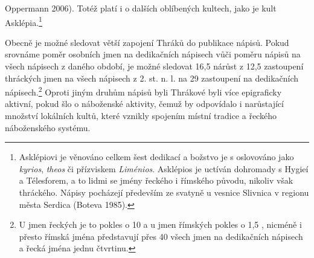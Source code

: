 Oppermann 2006). Totéž platí i o dalších oblíbených kultech, jako je kult Asklépia.\footnote{Asklépiovi je věnováno celkem šest dedikací a božstvo je s oslovováno jako {\em kyrios}, {\em theos} či přízviskem {\em Liménios}. Asklépios je uctíván dohromady s Hygieí a Télesforem, a to lidmi se jmény řeckého i římského původu, nikoliv však thráckého. Nápisy pocházejí především ze svatyně u vesnice Slivnica v regionu města Serdica (Boteva 1985).}

Obecně je možné sledovat větší zapojení Thráků do publikace nápisů. Pokud srovnáme poměr osobních jmen na dedikačních nápisech vůči poměru nápisů na všech nápisech z daného období, je možné sledovat 16,5 nárůst z 12,5 zastoupení thráckých jmen na všech nápisech z 2. st. n. l. na 29  zastoupení na dedikačních nápisech.\footnote{U jmen řeckých je to pokles o 10  a u jmen římských pokles o 1,5 , nicméně i přesto římská jména představují přes 40  všech jmen na dedikačních nápisech a řecká jména jednu čtvrtinu.} Oproti jiným druhům nápisů byli Thrákové byli více epigraficky aktivní, pokud šlo o náboženské aktivity, čemuž by odpovídalo i narůstající množství lokálních kultů, které vznikly spojením místní tradice a řeckého náboženského systému.

